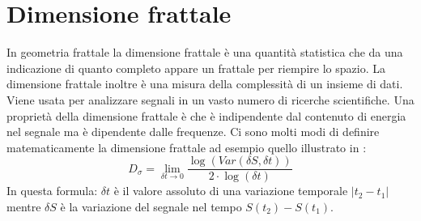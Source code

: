 \section{Dimensione frattale}
\label{frattale}
In geometria frattale la dimensione frattale \`e una quantit\`a statistica che da una indicazione di quanto completo appare un frattale per riempire lo spazio. 
La dimensione frattale inoltre \`e una misura della complessit\`a di un insieme di dati. 
Viene usata per analizzare segnali in un vasto numero di ricerche scientifiche. 
Una propriet\`a della dimensione frattale \`e che \`e indipendente dal contenuto di energia nel segnale ma \`e dipendente dalle frequenze. 
Ci sono molti modi di definire matematicamente la dimensione frattale ad esempio quello illustrato in \cite{RSDUVFD}:
\[
  D_{\sigma} = \displaystyle\lim_{\delta t \rightarrow 0} \frac{\log(Var(\delta S, \delta t))}{2 \cdot \log(\delta t)}
\]
In questa formula: $\delta t$ \`e il valore assoluto di una variazione temporale $|t_{2}-t_{1}|$ mentre $\delta S$ \`e la variazione del segnale nel tempo $S(t_{2})-S(t_{1})$.



 